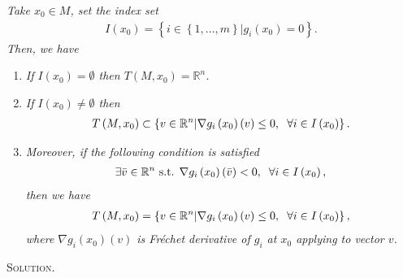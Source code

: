 \documentclass[a4paper]{article}
\numberwithin{equation}{section}
\begin{document}
\textit{Take $x_0 \in M$, set the index set}
\begin{align}
I\left( {{x_0}} \right) = \left\{ {i \in \left\{ {1, \ldots ,m} \right\}|{g_i}\left( {{x_0}} \right) = 0} \right\}.
\end{align}
\textit{Then, we have}
\begin{enumerate}
\item \textit{If $I\left(x_0\right) =\emptyset$ then $T\left(M,x_0\right) = \mathbb{R}^n$.}
\item \textit{If $I\left(x_0\right) \ne \emptyset$ then}
\begin{align}
\label{1.50}
T\left( {M,{x_0}} \right) \subset \left\{ {v \in {\mathbb{R}^n}|\nabla {g_i}\left( {{x_0}} \right)\left( v \right) \le 0, \hspace{0.2cm} \forall i \in I\left( {{x_0}} \right)} \right\}.
\end{align}
\item \textit{Moreover, if the following condition is satisfied}
\begin{align}
\label{1.51}
\exists \bar v \in {\mathbb{R}^n}\mbox{ s.t. }\nabla {g_i}\left( {{x_0}} \right)\left( {\bar v} \right) < 0,\hspace{0.2cm}\forall i \in I\left( {{x_0}} \right),
\end{align}
\textit{then we have}
\begin{align}
\label{1.52}
T\left( {M,{x_0}} \right) = \left\{ {v \in {\mathbb{R}^n}|\nabla {g_i}\left( {{x_0}} \right)\left( v \right) \le 0,\hspace{0.2cm} \forall i \in I\left( {{x_0}} \right)} \right\},
\end{align}
\textit{where ${\nabla {g_i}\left( {{x_0}} \right)\left( v \right)}$ is Fr\'{e}chet derivative of $g_i$ at $x_0$ applying to vector $v$.}
\end{enumerate}
\textsc{Solution.} 
\end{document}
